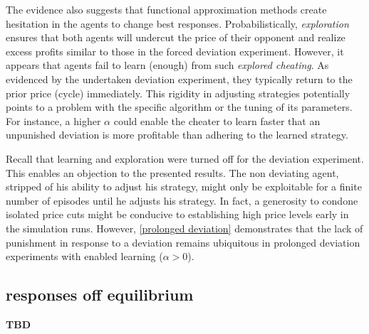 The evidence also suggests that functional approximation methods create hesitation in the agents to change best responses. Probabilistically, \emph{exploration} ensures that both agents will undercut the price of their opponent and realize excess profits similar to those in the forced deviation experiment. However, it appears that agents fail to learn (enough) from such \emph{explored cheating}. As evidenced by the undertaken deviation experiment, they typically return to the prior price (cycle) immediately. This rigidity in adjusting strategies potentially points to a problem with the specific algorithm or the tuning of its parameters. For instance, a higher $\alpha$ could enable the cheater to learn faster that an unpunished deviation is more profitable than adhering to the learned strategy. 

Recall that learning and exploration were turned off for the deviation experiment. This enables an objection to the presented results. The non deviating agent, stripped of his ability to adjust his strategy, might only be exploitable for a finite number of episodes until he adjusts his strategy. In fact, a generosity to condone isolated price cuts might be conducive to establishing high price levels early in the simulation runs. However, \autoref{prolonged deviation} demonstrates that the lack of punishment in response to a deviation remains ubiquitous in prolonged deviation experiments with enabled learning ($\alpha > 0$).

\subsection{responses off equilibrium}

\textbf{TBD}



